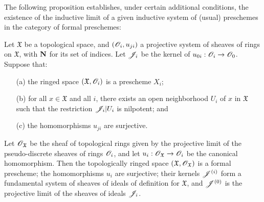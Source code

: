 The following proposition establishes, under certain additional conditions, the existence of the inductive limit of a given inductive system of (usual) preschemes in the category of formal preschemes:
\begin{proposition}[10.6.3]
\label{1.10.6.3}
Let $\mathfrak{X}$ be a topological space, and $(\mathscr{O}_i,u_{ji})$ a projective system of sheaves of rings on $\mathfrak{X}$, with $\mathbf{N}$ for its set of indices.
Let $\mathscr{J}_i$ be the kernel of $u_{0i}:\sh{O}_i\to\sh{O}_0$.
Suppose that:
\begin{enumerate}
  \item[\rm{(a)}] the ringed space $(\mathfrak{X},\mathscr{O}_i)$ is a prescheme $X_i$;
  \item[\rm{(b)}] for all $x\in\mathfrak{X}$ and all $i$, there exists an open neighborhood $U_i$ of $x$ in $\mathfrak{X}$ such that the restriction $\mathscr{J}_i|U_i$ is nilpotent; and
  \item[\rm{(c)}] the homomorphisms $u_{ji}$ are surjective.
\end{enumerate}

Let $\mathscr{O}_\mathfrak{X}$ be the sheaf of topological rings given by the projective limit of the pseudo-discrete sheaves of rings $\mathscr{O}_i$, and let $u_i:\sh{O}_\mathfrak{X}\to\sh{O}_i$ be the canonical homomorphism.
Then the topologically ringed space $(\mathfrak{X},\mathscr{O}_\mathfrak{X})$ is a formal prescheme; the homomorphisms $u_i$ are surjective; their kernels $\mathscr{J}^{(i)}$ form a fundamental system of sheaves of ideals of definition for $\mathfrak{X}$, and $\mathscr{J}^{(0)}$ is the projective limit of the sheaves of ideals $\mathscr{J}_i$.
\end{proposition}


